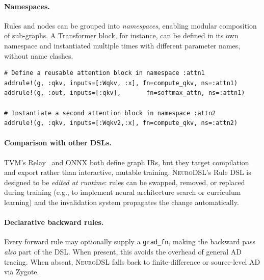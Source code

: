 \documentclass{article}
\begin{document}
\paragraph{Namespaces.} Rules and nodes can be grouped into \emph{namespaces}, enabling modular composition of sub-graphs. A Transformer block, for instance, can be defined in its own namespace and instantiated multiple times with different parameter names, without name clashes.

\begin{lstlisting}[caption={Namespace-based modular composition}, label={lst:namespace}]
# Define a reusable attention block in namespace :attn1
addrule!(g, :qkv, inputs=[:Wqkv, :x], fn=compute_qkv, ns=:attn1)
addrule!(g, :out, inputs=[:qkv],       fn=softmax_attn, ns=:attn1)

# Instantiate a second attention block in namespace :attn2
addrule!(g, :qkv, inputs=[:Wqkv2,:x], fn=compute_qkv, ns=:attn2)
\end{lstlisting}

\paragraph{Comparison with other DSLs.} TVM's Relay~\cite{tvm} and ONNX both define graph IRs, but they target compilation and export rather than interactive, mutable training. \textsc{NeuroDSL}'s Rule DSL is designed to be \emph{edited at runtime}: rules can be swapped, removed, or replaced during training (e.g., to implement neural architecture search or curriculum learning) and the invalidation system propagates the change automatically.

\paragraph{Declarative backward rules.} Every forward rule may optionally supply a \texttt{grad\_fn}, making the backward pass \emph{also} part of the DSL. When present, this avoids the overhead of general AD tracing. When absent, \textsc{NeuroDSL} falls back to finite-difference or source-level AD via Zygote.
\end{document}
